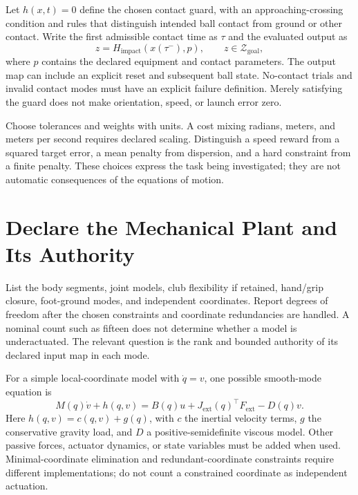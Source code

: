 Let $h(x,t)=0$ define the chosen contact guard, with an approaching-crossing condition and rules that distinguish intended ball contact from ground or other contact. Write the first admissible contact time as $\tau$ and the evaluated output as
\begin{equation}
z=H_{\mathrm{impact}}(x(\tau^-),p),\qquad z\in\mathcal Z_{\mathrm{goal}},
\end{equation}
where $p$ contains the declared equipment and contact parameters. The output map can include an explicit reset and subsequent ball state. No-contact trials and invalid contact modes must have an explicit failure definition. Merely satisfying the guard does not make orientation, speed, or launch error zero.

Choose tolerances and weights with units. A cost mixing radians, meters, and meters per second requires declared scaling. Distinguish a speed reward from a squared target error, a mean penalty from dispersion, and a hard constraint from a finite penalty. These choices express the task being investigated; they are not automatic consequences of the equations of motion.

\section{Declare the Mechanical Plant and Its Authority}

List the body segments, joint models, club flexibility if retained, hand/grip closure, foot-ground modes, and independent coordinates. Report degrees of freedom after the chosen constraints and coordinate redundancies are handled. A nominal count such as fifteen does not determine whether a model is underactuated. The relevant question is the rank and bounded authority of its declared input map in each mode.

For a simple local-coordinate model with $\dot q=v$, one possible smooth-mode equation is
\begin{equation}
M(q)\dot v+h(q,v)
=B(q)u+J_{\mathrm{ext}}(q)^\top F_{\mathrm{ext}}-D(q)v .
\end{equation}
Here $h(q,v)=c(q,v)+g(q)$, with $c$ the inertial velocity terms, $g$ the conservative gravity load, and $D$ a positive-semidefinite viscous model. Other passive forces, actuator dynamics, or state variables must be added when used. Minimal-coordinate elimination and redundant-coordinate constraints require different implementations; do not count a constrained coordinate as independent actuation.

